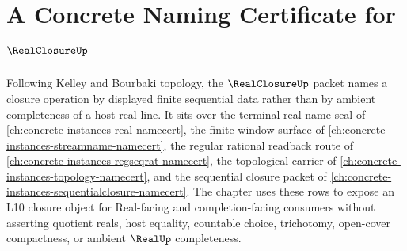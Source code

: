 \chapter{A Concrete Naming Certificate for $\RealClosureUp$}
\label{ch:concrete-instances-real-closure-namecert}

Following Kelley and Bourbaki topology, the $\RealClosureUp$ packet names a closure operation by displayed finite sequential data rather than by ambient completeness of a host real line. It sits over the terminal real-name seal of \autoref{ch:concrete-instances-real-namecert}, the finite window surface of \autoref{ch:concrete-instances-streamname-namecert}, the regular rational readback route of \autoref{ch:concrete-instances-regseqrat-namecert}, the topological carrier of \autoref{ch:concrete-instances-topology-namecert}, and the sequential closure packet of \autoref{ch:concrete-instances-sequentialclosure-namecert}. The chapter uses these rows to expose an L10 closure object for Real-facing and completion-facing consumers without asserting quotient reals, host equality, countable choice, trichotomy, open-cover compactness, or ambient $\RealUp$ completeness.

